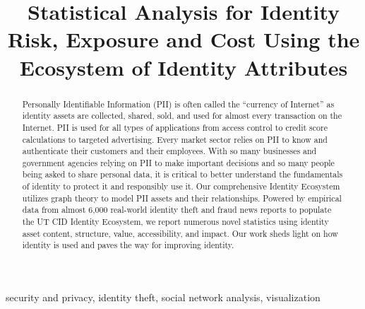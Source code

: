 \documentclass[conference]{IEEEtran}
\begin{document}
\title{Statistical  Analysis  for  Identity  Risk,  Exposure  and  Cost  Using  the Ecosystem  of  Identity  Attributes
}

\author{
\and
{}
\and
{}
}
\maketitle

\begin{abstract}
Personally Identifiable Information (PII) is often called the ``currency of Internet'' as identity assets are collected, shared, sold, and used for almost every transaction on the Internet.  PII is used for all types of applications from access control to credit score calculations to targeted advertising.  Every market sector relies on PII to know and authenticate their customers and their employees.   With so many businesses and government agencies relying on PII to make important decisions and so many people being asked to share personal data, it is critical to better understand the fundamentals of identity to protect it and responsibly use it.  Our comprehensive Identity Ecosystem utilizes graph theory to model PII assets and their relationships.  Powered by empirical data from almost 6,000 real-world identity theft and fraud news reports to populate the UT CID Identity Ecosystem, we report numerous novel statistics using identity asset content, structure, value, accessibility, and impact.  Our work sheds light on how identity is used and paves the way for improving identity.
\end{abstract}

\begin{IEEEkeywords}
security and privacy, identity theft, social network analysis, visualization
\end{IEEEkeywords}
\end{document}
